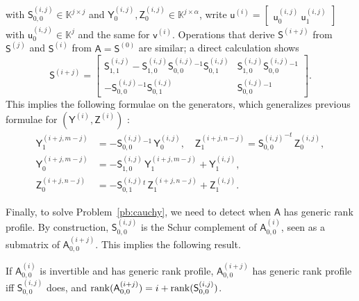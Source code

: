 \documentclass[sigconf]{acmart}
\newcommand{\vu}{\ensuremath{\mathsf{u}}}
\newcommand{\vv}{\ensuremath{\mathsf{v}}}
\newcommand{\mA}{\ensuremath{\mathsf{A}}}
\newcommand{\mI}{\ensuremath{\mathsf{I}}}
\newcommand{\mR}{\ensuremath{\mathsf{R}}}
\newcommand{\mS}{\ensuremath{\mathsf{S}}}
\newcommand{\mY}{\ensuremath{\mathsf{Y}}}
\newcommand{\mZ}{\ensuremath{\mathsf{Z}}}
\newcommand{\K}{\ensuremath{\mathbb{K}}}
\theoremstyle{acmdefinition}
\begin{document}
with $\mS^{(i,j)}_{0,0} \in \K^{j \times j}$ and
$\mY^{(i,j)}_0, \mZ^{(i,j)}_0 \in \K^{j \times \alpha}$, write
$\vu^{(i)} = 
[\begin{smallmatrix} \vu^{(i,j)}_0 \  \vu^{(i,j)}_1 
  \end{smallmatrix} ]$ 
with $\vu^{(i,j)}_0 \in \K^j$ and the same for $\vv^{(i)}$.
Operations that derive $\mS^{(i+j)}$ from
$\mS^{(j)}$ and $\mS^{(i)}$ from $\mA=\mS^{(0)}$ are similar; a direct calculation shows
\begin{equation}
\label{eq:Si+j}
\mS^{(i+j)} = 
\begin{bmatrix} 
  \mS^{(i,j)}_{1,1} - \mS^{(i,j)}_{1,0} {\mS^{(i,j)}_{0,0}}{}^{-1} \mS^{(i,j)}_{0,1} 
  & 
  \mS^{(i,j)}_{1,0} {\mS^{(i,j)}_{0,0}}{}^{-1} 
  \\[1mm]
  -{\mS^{(i,j)}_{0,0}}{}^{-1} \mS^{(i,j)}_{0,1}
  &  
  {\mS^{(i,j)}_{0,0}}{}^{-1} 
\end{bmatrix}.
\end{equation}
This implies the following formulae on the generators, which
generalizes previous formulae for $(\mY^{(i)},\mZ^{(i)})$ :
\begin{align}
\mY^{(i+j,m-j)}_1&= -{\mS^{(i,j)}_{0,0}}{}^{-1} \,\mY^{(i,j)}_0,\quad
\mZ^{(i+j,n-j)}_1= {\mS^{(i,j)}_{0,0}}^{-t} \,\mZ^{(i,j)}_0, \nonumber\\
\mY^{(i+j,m-j)}_0&=-\mS^{(i,j)}_{1,0} \,\mY^{(i+j,m-j)}_1 + \mY^{(i,j)}_1,\label{eq:Yi+j}\\
\mZ^{(i+j,n-j)}_0&=-{\mS^{(i,j)}_{0,1}}{}^t \,\mZ^{(i+j,n-j)}_1 + \mZ^{(i,j)}_1 \nonumber.
\end{align}
%

Finally, to solve Problem~\ref{pb:cauchy}, we need to detect when $\mA$ has
generic rank profile. By construction, $\mS^{(i,j)}_{0,0}$ is the
Schur complement of ${\mA^{(i)}_{0,0}}$, seen as a submatrix of
$\mA^{(i+j)}_{0,0}$. This implies the following result.
%
\begin{lemma}\label{lemma:update}
 If $\mA^{(i)}_{0,0}$ is invertible and has generic rank
  profile,
  $\mA^{(i+j)}_{0,0}$ has generic rank profile iff
  $\mS^{(i,j)}_{0,0}$ does, and
  ${\rm rank}(\mA^{(i+j)}_{0,0})=i+{\rm rank}(\mS^{(i,j)}_{0,0})$. 
\end{lemma}
%
\end{document}

